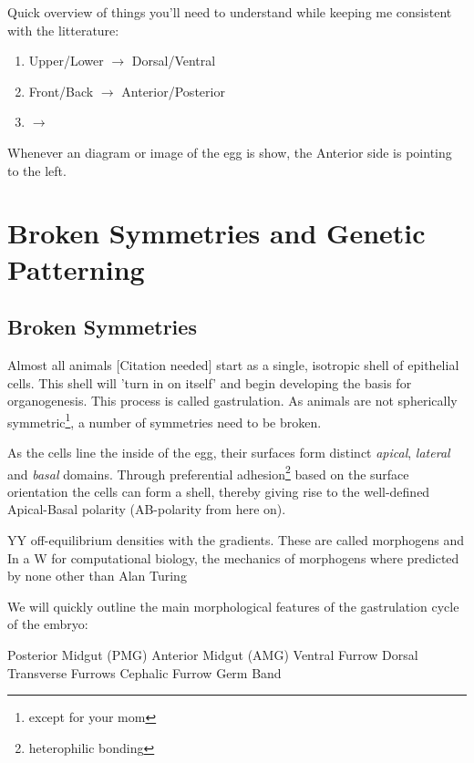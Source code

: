 Quick overview of things you'll need to understand while keeping me consistent with the litterature:

\begin{enumerate}
    \item Upper/Lower $\rightarrow$ Dorsal/Ventral
    \item Front/Back  $\rightarrow$ Anterior/Posterior
    \item   $\rightarrow$
\end{enumerate}

Whenever an diagram or image of the egg is show, the Anterior side is pointing to the left.

\section{Broken Symmetries and Genetic Patterning}
\label{sec:theory-polarity}
\subsection{Broken Symmetries}

Almost all animals [Citation needed] start as a single, isotropic shell of epithelial cells. This shell will 'turn in on itself' and begin developing the basis for organogenesis. This process is called gastrulation. As animals are not spherically symmetric\footnote{except for your mom}, a number of symmetries need to be broken. 

As the cells line the inside of the egg, their surfaces form distinct \textit{apical}, \textit{lateral} and \textit{basal} domains. Through preferential adhesion\footnote{heterophilic bonding} based on the surface orientation the cells can form a shell, thereby giving rise to the well-defined Apical-Basal polarity (AB-polarity from here on). 

YY off-equilibrium densities with the gradients. These are called morphogens and 
In a W for computational biology, the mechanics of morphogens where predicted by none other than Alan Turing


We will quickly outline the main morphological features of the gastrulation cycle of the embryo:
\begin{outline}
    \1 Posterior Midgut (PMG)
    \1 Anterior Midgut (AMG)
    \1 Ventral Furrow
    \1 Dorsal Transverse Furrows
    \1 Cephalic Furrow
    \1 Germ Band
\end{outline}

